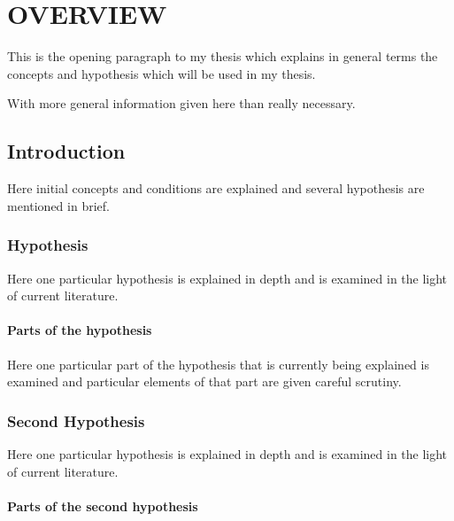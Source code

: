 \chapter{OVERVIEW}

This is the opening paragraph to my thesis which
explains in general terms the concepts and hypothesis
which will be used in my thesis.

With more general information given here than really
necessary.

\section{Introduction} \label{introSection}

Here initial concepts and conditions are explained and several hypothesis are mentioned in brief.

\subsection{Hypothesis}

Here one particular hypothesis is explained in depth and is examined in the light of current literature.

\subsubsection{Parts of the hypothesis}

Here one particular part of the hypothesis that is 
currently being explained is examined and particular
elements of that part are given careful scrutiny.


\subsection{Second Hypothesis}

Here one particular hypothesis is explained in depth
and is examined in the light of current literature.

\subsubsection{Parts of the second hypothesis}

